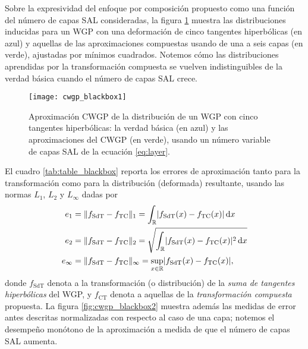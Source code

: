 Sobre la expresividad del enfoque por composición propuesto como una función del número de capas SAL consideradas, la figura \ref{fig:cwgp_blackbox1} muestra las distribuciones inducidas para un WGP con una deformación de cinco tangentes hiperbólicas (en azul) y aquellas de las aproximaciones compuestas usando de una a seis capas (en verde), ajustadas por mínimos cuadrados. Notemos cómo las distribuciones aprendidas por la transformación compuesta se vuelven indistinguibles de la verdad básica cuando el número de capas SAL crece.

\begin{figure}[h]
	\centering
	\texttt{[image: cwgp\_blackbox1]}
	\caption{Aproximación CWGP de la distribución de un WGP con cinco tangentes hiperbólicas: la verdad básica (en azul) y las aproximaciones del CWGP (en verde), usando un número variable de capas SAL de la ecuación \eqref{eq:layer}.}
	\label{fig:cwgp_blackbox1}
\end{figure}

El cuadro \ref{tab:table_blackbox} reporta los errores de aproximación tanto para la transformación como para la distribución (deformada) resultante, usando las normas \(L_1\), \(L_2\) y \(L_\infty\) dadas por
\begin{align*}
	e_1			&= \lVert f_{\mathrm{SdT}}-f_{\mathrm{TC}}\rVert_1 = \int_{\mathbb{R}} \lvert f_{\mathrm{SdT}}(x) - f_{\mathrm{TC}}(x) \rvert \dd{x}\\
	e_2			&= \lVert f_{\mathrm{SdT}}-f_{\mathrm{TC}}\rVert_2 = \sqrt{\int_{\mathbb{R}} \lvert f_{\mathrm{SdT}}(x) - f_{\mathrm{TC}}(x) \rvert^2 \dd{x}}\\
	e_\infty	&= \lVert f_{\mathrm{SdT}}-f_{\mathrm{TC}}\rVert_\infty = \sup_{x \in \mathbb{R}} \lvert f_{\mathrm{SdT}}(x) - f_{\mathrm{TC}}(x) \rvert,
\end{align*}
donde \(f_{\mathrm{SdT}}\) denota a la transformación (o distribución) de la \emph{suma de tangentes hiperbólicas} del WGP, y \(f_{\mathrm{CT}}\) denota a aquellas de la \emph{transformación compuesta} propuesta. La figura \ref{fig:cwgp_blackbox2} muestra además las medidas de error antes descritas normalizadas con respecto al caso de una capa; notemos el desempeño monótono de la aproximación a medida de que el número de capas SAL aumenta.


